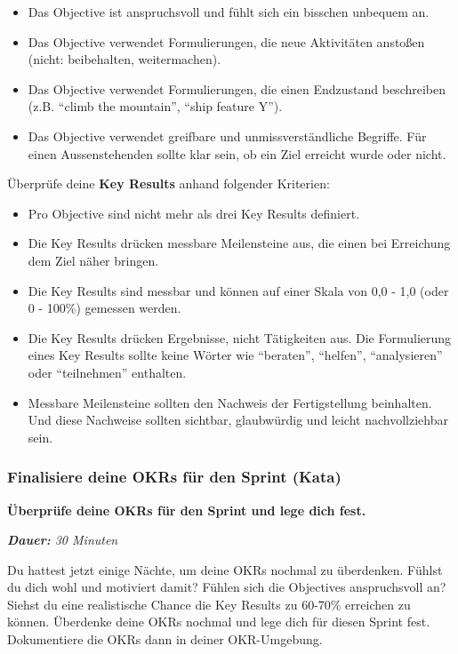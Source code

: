 \documentclass[
  ngerman,
  paper=a4,
,captions=tableheading
]{scrartcl}
\providecommand{\tightlist}{%
  \setlength{\itemsep}{0pt}\setlength{\parskip}{0pt}}
\begin{document}
\begin{itemize}
\tightlist
\item
  Das Objective ist anspruchsvoll und fühlt sich ein bisschen unbequem
  an.
\item
  Das Objective verwendet Formulierungen, die neue Aktivitäten anstoßen
  (nicht: beibehalten, weitermachen).
\item
  Das Objective verwendet Formulierungen, die einen Endzustand
  beschreiben (z.B. ``climb the mountain'', ``ship feature Y'').
\item
  Das Objective verwendet greifbare und unmissverständliche Begriffe.
  Für einen Aussenstehenden sollte klar sein, ob ein Ziel erreicht wurde
  oder nicht.
\end{itemize}

Überprüfe deine \textbf{Key Results} anhand folgender Kriterien:

\begin{itemize}
\tightlist
\item
  Pro Objective sind nicht mehr als drei Key Results definiert.
\item
  Die Key Results drücken messbare Meilensteine aus, die einen bei
  Erreichung dem Ziel näher bringen.
\item
  Die Key Results sind messbar und können auf einer Skala von 0,0 - 1,0
  (oder 0 - 100\%) gemessen werden.
\item
  Die Key Results drücken Ergebnisse, nicht Tätigkeiten aus. Die
  Formulierung eines Key Results sollte keine Wörter wie ``beraten'',
  ``helfen'', ``analysieren'' oder ``teilnehmen'' enthalten.
\item
  Messbare Meilensteine sollten den Nachweis der Fertigstellung
  beinhalten. Und diese Nachweise sollten sichtbar, glaubwürdig und
  leicht nachvollziehbar sein.
\end{itemize}

\hypertarget{finalisiere-deine-okrs-fuxfcr-den-sprint-kata}{%
\subsubsection{Finalisiere deine OKRs für den Sprint
(Kata)}\label{finalisiere-deine-okrs-fuxfcr-den-sprint-kata}}

\textbf{Überprüfe deine OKRs für den Sprint und lege dich fest.}

\emph{\textbf{Dauer:} 30 Minuten}

Du hattest jetzt einige Nächte, um deine OKRs nochmal zu überdenken.
Fühlst du dich wohl und motiviert damit? Fühlen sich die Objectives
anspruchsvoll an? Siehst du eine realistische Chance die Key Results zu
60-70\% erreichen zu können. Überdenke deine OKRs nochmal und lege dich
für diesen Sprint fest. Dokumentiere die OKRs dann in deiner
OKR-Umgebung.
\end{document}
